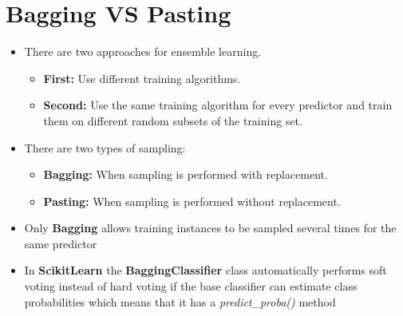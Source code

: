\documentclass{article}
\begin{document}
    \section{Bagging VS Pasting} 
    \begin{itemize}
	    \item There are two approaches for ensemble learning.
    	\begin{itemize}
    		\item \textbf{First:} Use different training algorithms.
    		\item \textbf{Second:} Use the same training algorithm for every predictor and train them on different random subsets of the training set.
    	\end{itemize}
	    \item There are two types of sampling:
	    \begin{itemize}
			\item \textbf{Bagging:} When sampling is performed with replacement.
	   		\item \textbf{Pasting:} When sampling is performed without replacement. 
	    \end{itemize}
    	\item Only \textbf{Bagging} allows training instances to be sampled several times for the same predictor 
    	\item In \textbf{Scikit\textendash Learn} the \textbf{BaggingClassifier} class automatically performs soft voting instead of hard voting if the base classifier can estimate class probabilities which means that it has a \textit{predict\_proba()} method
    	
    \end{itemize}
    
\end{document}
